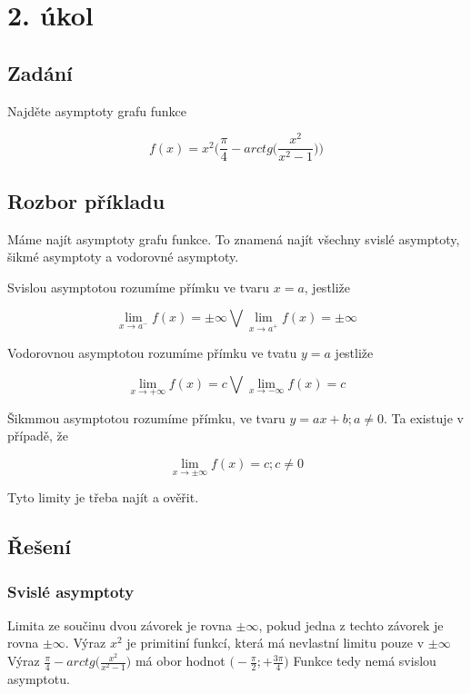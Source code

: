 \section{2. úkol}
\subsection{Zadání}

Najděte asymptoty grafu funkce 

\begin{displaymath}
f(x) = x^2\Big(\frac{\pi}{4}-arctg\Big(\frac{x^2}{x^2-1}\Big)\Big)
\end{displaymath}

\subsection{Rozbor příkladu}

Máme najít asymptoty grafu funkce. To znamená najít všechny svislé asymptoty, šikmé asymptoty a vodorovné asymptoty.

Svislou asymptotou rozumíme přímku ve tvaru $x=a$, jestliže 

\begin{displaymath}
\lim_{x \to a^-} f(x) = \pm \infty \bigvee\lim_{x \to a^+} f(x) = \pm \infty
\end{displaymath}

Vodorovnou asymptotou rozumíme přímku ve tvatu $y=a$ jestliže

\begin{displaymath}
\lim_{x \to +\infty} f(x) = c \bigvee\lim_{x \to - \infty} f(x) = c
\end{displaymath}

Šikmmou asymptotou rozumíme přímku, ve tvaru $y=ax+b;a \neq 0$. Ta existuje v případě, že

\begin{displaymath}
\lim_{x \to \pm \infty} f(x) = c ;c \neq 0
\end{displaymath}

Tyto limity je třeba najít a ověřit.

\subsection{Řešení}

\subsubsection{Svislé asymptoty}
Limita ze součinu dvou závorek je rovna $ \pm \infty$, pokud jedna z techto závorek je rovna $\pm \infty$. Výraz $x^2$ je primitiní funkcí, která má nevlastní limitu pouze v $\pm \infty$ Výraz $\frac{\pi}{4}-arctg\big(\frac{x^2}{x^2-1}\big)$ má obor hodnot $\big(-\frac{\pi}{2};+\frac{3\pi}{4}\big)$ Funkce tedy nemá svislou asymptotu.
